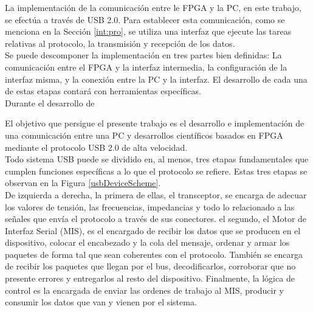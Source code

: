 La implementación de la comunicación entre le FPGA y la PC, en este trabajo, se efectúa a través de USB 2.0. Para establecer esta comunicación, como se menciona en la Sección \ref{int:pro}, se utiliza una interfaz que ejecute las tareas relativas al protocolo, la transmisión y recepción de los datos.\\

Se puede descomponer la implementación en tres partes bien definidas: La comunicación entre el FPGA y la interfaz intermedia, la configuración de la interfaz misma, y la conexión entre la PC y la interfaz. El desarrollo de cada una de estas etapas contará con herramientas específicas.\\
Durante el desarrollo de 





El objetivo que persigue el presente trabajo es el desarrollo e implementación de una comunicación entre una PC y desarrollos científicos basados en FPGA mediante el protocolo USB 2.0 de alta velocidad.\\

Todo sistema USB puede se dividido en, al menos, tres etapas fundamentales que cumplen funciones específicas a lo que el protocolo se refiere. Estas tres etapas se observan en la Figura \ref{usbDeviceScheme}.\\

De izquierda a derecha, la primera de ellas, el transceptor, se encarga de adecuar los valores de tensión, las frecuencias, impedancias y todo lo relacionado a las señales que envía el protocolo a través de sus conectores. el segundo, el Motor de Interfaz Serial (MIS), es el encargado de recibir los datos que se producen en el dispositivo, colocar el encabezado y la cola del mensaje, ordenar y armar los paquetes de forma tal que sean coherentes con el protocolo. También se encarga de recibir los paquetes que llegan por el bus, decodificarlos, corroborar que no presente errores y entregarlos al resto del dispositivo. Finalmente, la lógica de control es la encargada de enviar las ordenes de trabajo al MIS, producir y consumir los datos que van y vienen por el sistema.\\


